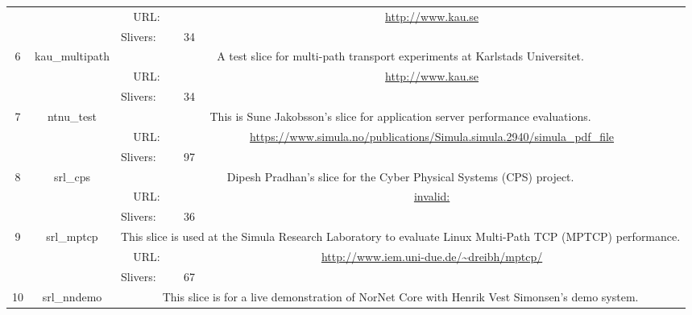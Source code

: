 \begin{small}
\begin{center}
\begin{longtable}{|c|c|c|c|}
  &  & \multicolumn{1}{|p{5em}|}{URL:} & \multicolumn{1}{|p{22.5em}|}{\url{http://www.kau.se}} \\* \cline{3-3}\cline{4-4}
  &  & \multicolumn{1}{|l|}{Slivers:} & \multicolumn{1}{|l|}{34} \\ \hline
 \multirow{3}{*}{6} & \multirow{3}{*}{\index{kau\_multipath}\index{Slice!kau\_multipath}kau\_multipath} & \multicolumn{2}{|p{30em}|}{A test slice for multi-path transport experiments at Karlstads Universitet.} \\* \cline{3-3}\cline{4-4}
  &  & \multicolumn{1}{|p{5em}|}{URL:} & \multicolumn{1}{|p{22.5em}|}{\url{http://www.kau.se}} \\* \cline{3-3}\cline{4-4}
  &  & \multicolumn{1}{|l|}{Slivers:} & \multicolumn{1}{|l|}{34} \\ \hline
 \multirow{3}{*}{7} & \multirow{3}{*}{\index{ntnu\_test}\index{Slice!ntnu\_test}ntnu\_test} & \multicolumn{2}{|p{30em}|}{This is Sune Jakobsson's slice for application server performance evaluations.} \\* \cline{3-3}\cline{4-4}
  &  & \multicolumn{1}{|p{5em}|}{URL:} & \multicolumn{1}{|p{22.5em}|}{\url{https://www.simula.no/publications/Simula.simula.2940/simula_pdf_file}} \\* \cline{3-3}\cline{4-4}
  &  & \multicolumn{1}{|l|}{Slivers:} & \multicolumn{1}{|l|}{97} \\ \hline
 \multirow{3}{*}{8} & \multirow{3}{*}{\index{srl\_cps}\index{Slice!srl\_cps}srl\_cps} & \multicolumn{2}{|p{30em}|}{Dipesh Pradhan's slice for the Cyber Physical Systems (CPS) project.} \\* \cline{3-3}\cline{4-4}
  &  & \multicolumn{1}{|p{5em}|}{URL:} & \multicolumn{1}{|p{22.5em}|}{\url{invalid:}} \\* \cline{3-3}\cline{4-4}
  &  & \multicolumn{1}{|l|}{Slivers:} & \multicolumn{1}{|l|}{36} \\ \hline
 \multirow{3}{*}{9} & \multirow{3}{*}{\index{srl\_mptcp}\index{Slice!srl\_mptcp}srl\_mptcp} & \multicolumn{2}{|p{30em}|}{This slice is used at the Simula Research Laboratory to evaluate Linux Multi-Path TCP (MPTCP) performance.} \\* \cline{3-3}\cline{4-4}
  &  & \multicolumn{1}{|p{5em}|}{URL:} & \multicolumn{1}{|p{22.5em}|}{\url{http://www.iem.uni-due.de/~dreibh/mptcp/}} \\* \cline{3-3}\cline{4-4}
  &  & \multicolumn{1}{|l|}{Slivers:} & \multicolumn{1}{|l|}{67} \\ \hline
 \multirow{3}{*}{10} & \multirow{3}{*}{\index{srl\_nndemo}\index{Slice!srl\_nndemo}srl\_nndemo} & \multicolumn{2}{|p{30em}|}{This slice is for a live demonstration of NorNet Core with Henrik Vest Simonsen's demo system.} \\* \cline{3-3}\cline{4-4}

\end{longtable}
\end{center}
\end{small}
